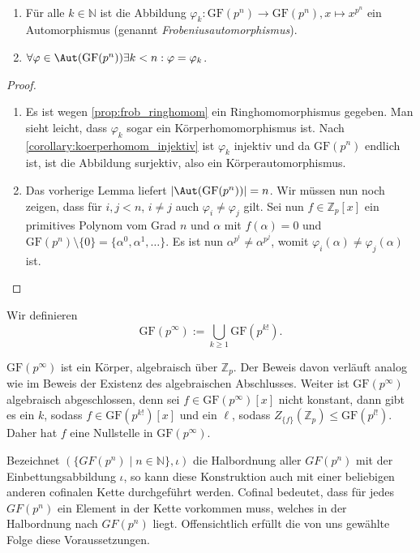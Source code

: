 \begin{theorem}{\ }
    \begin{enumerate}
        \item Für alle $k\in\mathbb{N}$ ist die Abbildung $\varphi_k: \mathrm{GF}(p^n) \to \mathrm{GF}(p^n), x \mapsto x^{p^n}$ ein Automorphismus (genannt \emph{Frobeniusautomorphismus}). 
        \item $\forall \varphi \in \Aut(\mathrm{GF}(p^n)) \exists k < n: \varphi = \varphi_k$.
    \end{enumerate}
\end{theorem}
\begin{proof}{\ }
    \begin{enumerate}
        \item Es ist wegen \cref*{prop:frob_ringhomom} ein Ringhomomorphismus gegeben. Man sieht leicht, dass $\varphi_k$ sogar ein Körperhomomorphismus ist. Nach \cref*{corollary:koerperhomom_injektiv} ist $\varphi_k$ injektiv und da $\mathrm{GF}(p^n)$ endlich ist, ist die Abbildung surjektiv, also ein Körperautomorphismus.
        
        \item Das vorherige Lemma liefert $\vert \Aut(\mathrm{GF}(p^n)) \vert = n$. Wir müssen nun noch zeigen, dass für $i, j < n$, $i \not= j$ auch $\varphi_i \not= \varphi_j$ gilt. Sei nun $f \in \mathbb{Z}_p[x]$ ein primitives Polynom vom Grad $n$ und $\alpha$ mit $f(\alpha) = 0$ und $\mathrm{GF}(p^n)\setminus\{0\} = \{\alpha^0, \alpha^1, \ldots\}$. Es ist nun $\alpha^{p^i} \not= \alpha^{p^j}$, womit $\varphi_i(\alpha) \not= \varphi_j(\alpha)$ ist.
    \end{enumerate}
\end{proof}

\begin{definition}
    Wir definieren 
        $$ \mathrm{GF}\left(p^\infty\right) := \bigcup_{k \ge 1} \mathrm{GF}\left(p^{k!}\right). $$
\end{definition}
\begin{remark}
    $\mathrm{GF}(p^\infty)$ ist ein Körper, algebraisch über $\mathbb{Z}_p$. Der Beweis davon verläuft analog wie im Beweis der Existenz des algebraischen Abschlusses. Weiter ist $\mathrm{GF}(p^\infty)$ algebraisch abgeschlossen, denn sei $f \in \mathrm{GF}(p^\infty)[x]$ nicht konstant, dann gibt es ein $k$, sodass $f \in \mathrm{GF}(p^{k!})[x]$ und ein $\mathbb{\ell}$, sodass $Z_{\{f\}}(\mathbb{Z}_p) \le \mathrm{GF}(p^{l!})$. Daher hat $f$ eine Nullstelle in $\mathrm{GF}(p^\infty)$.

    Bezeichnet $(\{GF(p^{n})\mid n\in\mathbb{N}\},\iota)$ die Halbordnung aller $GF(p^n)$ mit der Einbettungsabbildung $\iota$, so kann diese Konstruktion auch mit einer beliebigen anderen cofinalen Kette durchgeführt werden. Cofinal bedeutet, dass für jedes $GF(p^n)$ ein Element in der Kette vorkommen muss, welches in der Halbordnung nach $GF(p^n)$ liegt. Offensichtlich erfüllt die von uns gewählte Folge diese Voraussetzungen.
\end{remark}